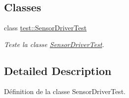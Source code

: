 \subsection*{Classes}
\begin{DoxyCompactItemize}
\item 
class \hyperlink{classtest_1_1SensorDriverTest}{test\+::\+Sensor\+Driver\+Test}
\begin{DoxyCompactList}\small\item\em Teste la classe \hyperlink{classtest_1_1SensorDriverTest}{Sensor\+Driver\+Test}. \end{DoxyCompactList}\end{DoxyCompactItemize}


\subsection{Detailed Description}
Définition de la classe Sensor\+Driver\+Test. 

